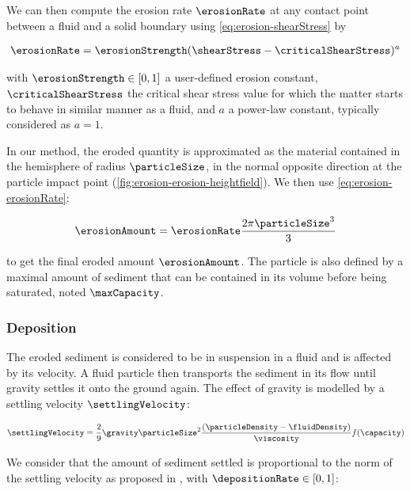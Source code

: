 We can then compute the erosion rate $\erosionRate$ at any contact point between a fluid and a solid boundary using \eqref{eq:erosion-shearStress} by 

\begin{align}
    \label{eq:erosion-erosionRate}
    \erosionRate = \erosionStrength (\shearStress - \criticalShearStress)^a
\end{align}

with $\erosionStrength \in [0,1]$ a user-defined erosion constant, $\criticalShearStress$ the critical shear stress value for which the matter starts to behave in similar manner as a fluid, and $a$ a power-law constant, typically considered as $a = 1$. 

In our method, the eroded quantity is approximated as the material contained in the hemisphere of radius $\particleSize$, in the normal opposite direction at the particle impact point (\cref{fig:erosion-erosion-heightfield}). We then use \eqref{eq:erosion-erosionRate}: 

\begin{align}
    \label{eq:erosion-erosionAmount} 
    \erosionAmount = \erosionRate \frac{ 2 \pi \particleSize^3 }{ 3 }
\end{align}

to get the final eroded amount $\erosionAmount$. The particle is also defined by a maximal amount of sediment that can be contained in its volume before being saturated, noted $\maxCapacity$. %

\subsubsection{Deposition}
The eroded sediment is considered to be in suspension in a fluid and is affected by its velocity. A fluid particle then transports the sediment in its flow until gravity settles it onto the ground again. The effect of gravity is modelled by a settling velocity $\settlingVelocity$:

\begin{align} 
    \label{eq:erosion-initialSettlingVelocity}
    \settlingVelocity = \frac{ 2 }{ 9 }  \gravity \particleSize^2 \frac{(\particleDensity - \fluidDensity)}{\viscosity } f(\capacity)
\end{align} 

We consider that the amount of sediment settled is proportional to the norm of the settling velocity as proposed in \cite{Wojtan2007}, with $\depositionRate \in [0,1]$: 


